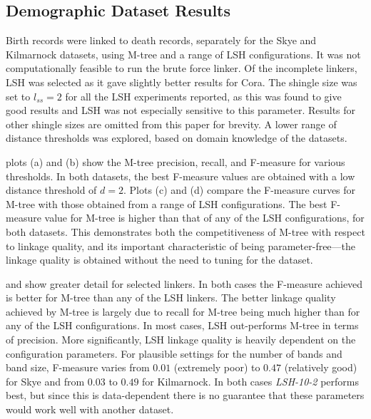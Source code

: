 \documentclass{llncs}
\begin{document}

\subsection{Demographic Dataset Results}

Birth records were linked to death records, separately for the Skye and
Kilmarnock datasets, using M-tree and a range of LSH configurations. It
was not computationally feasible to run the brute force linker. Of the
incomplete linkers, LSH was selected as it gave slightly better results
for Cora. The shingle size was set to $l_{ss}=2$ for all the LSH
experiments reported, as this was found to give good results and LSH
was not especially sensitive to this parameter. Results for other
shingle sizes are omitted from this paper for brevity. A lower range
of distance thresholds was explored, based on domain knowledge of the
datasets.

 plots (a) and (b) show the M-tree precision,
recall, and F-measure for various thresholds. In both datasets, the best
F-measure values are obtained with a low distance threshold of $d=2$.
Plots (c) and (d) compare the F-measure curves for M-tree with those
obtained from a range of LSH configurations. The best F-measure value
for M-tree is higher than that of any of the LSH configurations, for
both datasets. This demonstrates both the competitiveness of M-tree
with respect to linkage quality, and its important characteristic of
being parameter-free---the linkage quality is obtained without the
need to tuning for the dataset.

 and
 show greater detail for
selected linkers. In both cases the F-measure achieved is better for
M-tree than any of the LSH linkers. The better linkage quality achieved
by M-tree is largely due to recall for M-tree being much higher than for
any of the LSH configurations. In most cases, LSH out-performs M-tree in
terms of precision. More significantly, LSH linkage quality is heavily
dependent on the configuration parameters. For plausible settings for
the number of bands and band size, F-measure varies from $0.01$
(extremely poor) to $0.47$ (relatively good) for Skye and from $0.03$
to $0.49$ for Kilmarnock. In both cases \emph{LSH-10-2} performs best,
but since this is data-dependent there is no guarantee that these
parameters would work well with another dataset.
\end{document}
